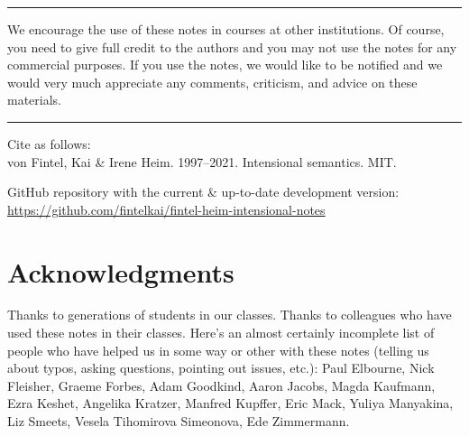 \plainbreak{1} 

We encourage the use of these notes in courses at other institutions. Of course,
you need to give full credit to the authors and you may not use the notes for
any commercial purposes. If you use the notes, we would like to be notified and
we would very much appreciate any comments, criticism, and advice on these
materials.

\plainbreak{1}

Cite as follows: \\
von Fintel, Kai \& Irene Heim. 1997--2021. Intensional semantics. MIT.

\medskip

\noindent GitHub repository with the current \& up-to-date development version:\\
\url{https://github.com/fintelkai/fintel-heim-intensional-notes}

\clearpage

\vspace*{\fill}

\section*{Acknowledgments}

Thanks to generations of students in our classes. Thanks to colleagues who have
used these notes in their classes. Here's an almost certainly incomplete list of
people who have helped us in some way or other with these notes (telling us
about typos, asking questions, pointing out issues, etc.): Paul Elbourne, Nick
Fleisher, Graeme Forbes, Adam Goodkind, Aaron Jacobs, Magda Kaufmann, Ezra
Keshet, Angelika Kratzer, Manfred Kupffer, Eric Mack, Yuliya Manyakina, Liz
Smeets, Vesela Tihomirova Simeonova, Ede Zimmermann.

